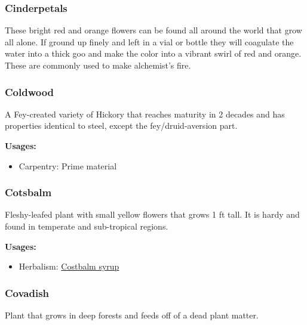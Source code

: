 \subsubsection{Cinderpetals}
\label{Cinderpetals}

These bright red and orange flowers can be found all around the world that grow all alone. If ground up finely and left in a vial or bottle they will coagulate the water into a thick goo and make the color into a vibrant swirl of red and orange. These are commonly used to make alchemist's fire.

\subsubsection{Coldwood}
\label{Coldwood}

A Fey-created variety of Hickory that reaches maturity in 2 decades and has properties identical to steel, except the fey/druid-aversion part.

\vspace{5mm}

\textbf{Usages:}

\begin{itemize}[noitemsep]
\item[] Carpentry: Prime material
\end{itemize}

\subsubsection{Cotsbalm}
\label{Cotsbalm}

Fleshy-leafed plant with small yellow flowers that grows 1 ft tall. It is hardy and found in temperate and sub-tropical regions.

\vspace{5mm}

\textbf{Usages:}

\begin{itemize}[noitemsep]
\item[] Herbalism: \hyperref[Costbalm syrup]{Costbalm syrup}
\end{itemize}

\subsubsection{Covadish}
\label{Covadish}

Plant that grows in deep forests and feeds off of a dead plant matter.

\vspace{5mm}

